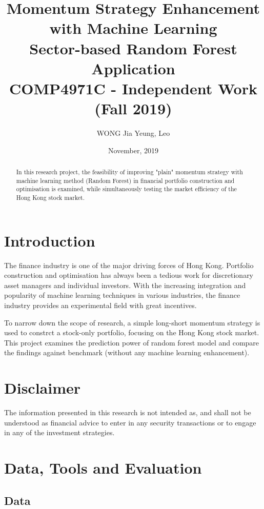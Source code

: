 \documentclass[12pt]{article}
\title{Momentum Strategy Enhancement \\ with Machine Learning \\[2ex]
  \large Sector-based Random Forest Application \\[4ex]
  \large COMP4971C - Independent Work (Fall 2019)}
\author{WONG Jia Yeung, Leo}
\date{November, 2019}
\begin{document}
\begin{titlingpage}
  \maketitle
  \begin{abstract}
    In this research project, the feasibility of improving "plain" momentum strategy with machine learning method (Random Forest) in financial portfolio construction and optimisation is examined, while simultaneously testing the market efficiency of the Hong Kong stock market.
  \end{abstract}
\end{titlingpage}


\tableofcontents


\section{Introduction}

The finance industry is one of the major driving forces of Hong Kong. Portfolio construction and optimisation has always been a tedious work for discretionary asset managers and individual investors. With the increasing integration and popularity of machine learning techniques in various industries, the finance industry provides an experimental field with great incentives.

To narrow down the scope of research, a simple long-short momentum strategy is used to constrct a stock-only portfolio, focusing on the Hong Kong stock market. This project examines the prediction power of random forest model and compare the findings against benchmark (without any machine learning enhancement).


\section{Disclaimer}

The information presented in this research is not intended as, and shall not be understood as financial advice to enter in any security transactions or to engage in any of the investment strategies.


\section{Data, Tools and Evaluation}

\subsection{Data}
\end{document}
